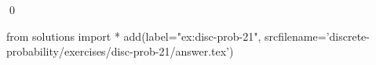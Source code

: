 
\begin{ex} 
  \label{ex:disc-prob-21}
  
  \qed
\end{ex} 
\begin{python0}
from solutions import *
add(label="ex:disc-prob-21",
    srcfilename='discrete-probability/exercises/disc-prob-21/answer.tex') 
\end{python0}
